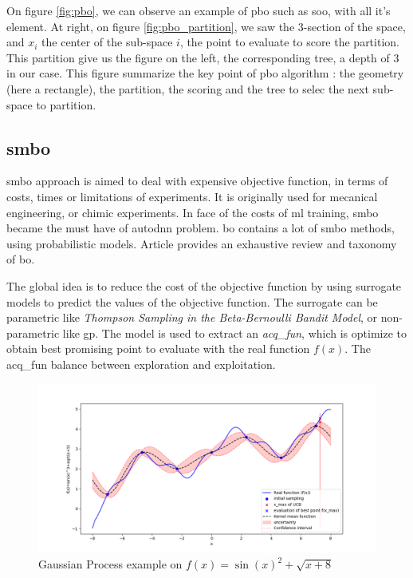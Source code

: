 On figure \ref{fig:pbo}, we can observe an example of \acrlong{pbo} such as \acrshort{soo}, with all it's element. At right, on figure \ref{fig:pbo_partition}, we saw the 3-section of the space, and $x_i$ the center of the sub-space $i$, the point to evaluate to score the partition. This partition give us the figure on the left, the corresponding tree, a depth of 3 in our case. This figure summarize the key point of \acrshort{pbo} algorithm : the geometry (here a rectangle), the partition, the scoring and the tree to selec the next sub-space to partition. 

\subsection{\acrfull{smbo}} 
\label{sec:smbo}  
 

\acrfull{smbo} approach is aimed to deal with expensive objective function, in terms of costs, times or limitations of experiments. It is originally used for mecanical engineering, or chimic experiments. In face of the costs of \acrshort{ml} training, \acrshort{smbo} became the must have of \acrshort{autodnn} problem. \acrfull{bo} contains a lot of \acrshort{smbo} methods, using probabilistic models. Article \cite{shahriari_taking_2016} provides an exhaustive review and taxonomy of \acrfull{bo}.

The global idea is to reduce the cost of the objective function by using surrogate models to predict the values of the objective function. The surrogate can be parametric like \textit{Thompson Sampling in the Beta-Bernoulli Bandit Model}, or non-parametric like \acrfull{gp}. The model is used to extract an \textit{\gls{acq_fun}}, which is optimize to obtain best promising point to evaluate with the real function $f(x)$. The \gls{acq_fun} balance between exploration and exploitation. 

\begin{figure}[h]
    \centering
    \includegraphics[width=0.8\linewidth]{assets/img/chap_2/plots/gaussian_process.png}
    \caption{Gaussian Process example on $f(x)=\sin(x)^2+\sqrt{x+8}$}
    \label{fig:gp_eg}
\end{figure}


